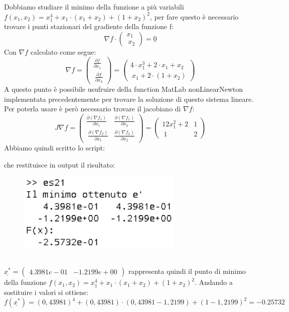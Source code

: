 \begin{flushleft}
Dobbiamo studiare il minimo della funzione a più variabili $f(x_1,x_2)=x_1^4+x_1\cdot(x_1+x_2)+(1+x_2)^2$, per fare questo è necessario trovare i punti stazionari del gradiente della funzione f:
\[
\nabla f \cdot \begin{pmatrix} x_1 \\\ x_2 \end{pmatrix} = \underline{0}
\]
Con $\nabla f$ calcolato come segue:
\[
\nabla f = \begin{pmatrix} \frac{\partial f}{\partial x_1} \\\ \frac{\partial f}{\partial x_2} \end{pmatrix} = \begin{pmatrix} 4\cdot x_1^3+2\cdot x_1 + x_2 \\\ x_1+2\cdot(1+x_2)\end{pmatrix}
\]
A questo punto è possibile usufruire della function MatLab nonLinearNewton implementata precedentemente per trovare la soluzione di questo sistema lineare. Per poterla usare è però necessario trovare il jacobiano di $\nabla f$:
\[
J\nabla f = \begin{pmatrix} \frac{\partial (\nabla f_1)}{\partial x_1} & \frac{\partial (\nabla f_1)}{\partial x_2}  \\\ \frac{\partial (\nabla f_2)}{\partial x_1} & \frac{\partial (\nabla f_2)}{\partial x_2} \end{pmatrix} = \begin{pmatrix} 12x_1^2+2 & 1  \\\ 1 & 2 \end{pmatrix}
\]
Abbiamo quindi scritto lo script:

che restituisce in output il risultato:
\begin{figure}[h]
\includegraphics[left, width=300px]{cap_3/es21/es321}
\end{figure}
\newline \\
$\underline{x^*} = \begin{pmatrix} 4.3981e-01 & -1.2199e+00 \end{pmatrix}$ rappresenta quindi il punto di minimo della funzione $f(x_1,x_2)=x_1^4+x_1\cdot(x_1+x_2)+(1+x_2)^2$. Andando a sostituire i valori si ottiene:
\[
f(\underline{x^*}) = (0,43981)^4+(0,43981)\cdot(0,43981-1,2199)+(1-1,2199)^2 = -0.25732
\]
\end{flushleft}